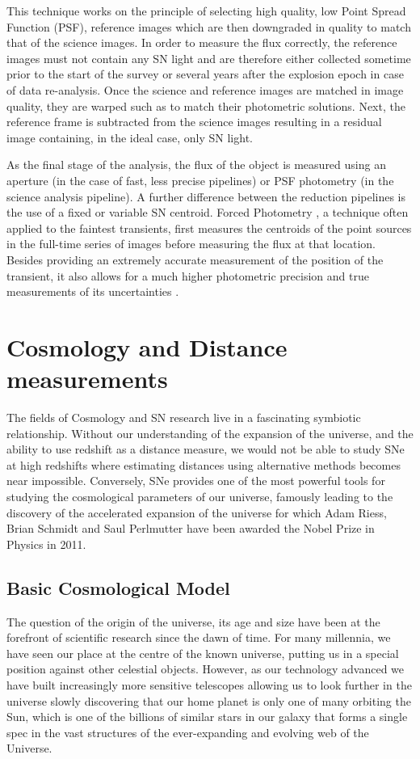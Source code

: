 This technique works on the principle of selecting high quality, low Point Spread Function (PSF), reference images which are then downgraded in quality to match that of the science images. In order to measure the flux correctly, the reference images must not contain any SN light and are therefore either collected sometime prior to the start of the survey or several years after the explosion epoch in case of data re-analysis. Once the science and reference images are matched in image quality, they are warped such as to match their photometric solutions. Next, the reference frame is subtracted from the science images resulting in a residual image containing, in the ideal case, only SN light.

As the final stage of the analysis, the flux of the object is measured using an aperture (in the case of fast, less precise pipelines) or PSF photometry (in the science analysis pipeline). A further difference between the reduction pipelines is the use of a fixed or variable SN centroid. Forced Photometry \citep{Bertin2011}, a technique often applied to the faintest transients, first measures the centroids of the point sources in the full-time series of images before measuring the flux at that location. Besides providing an extremely accurate measurement of the position of the transient, it also allows for a much higher photometric precision and true measurements of its uncertainties \citep{Firth2015}.

\section{Cosmology and Distance measurements}
The fields of Cosmology and SN research live in a fascinating symbiotic relationship. Without our understanding of the expansion of the universe, and the ability to use redshift as a distance measure, we would not be able to study SNe at high redshifts where estimating distances using alternative methods becomes near impossible. Conversely, SNe provides one of the most powerful tools for studying the cosmological parameters of our universe, famously leading to the discovery of the accelerated expansion of the universe \citep{Riess1998,Perlmutter1999} for which Adam Riess, Brian Schmidt and Saul Perlmutter have been awarded the Nobel Prize in Physics in 2011.

\subsection{Basic Cosmological Model}
The question of the origin of the universe, its age and size have been at the forefront of scientific research since the dawn of time. For many millennia, we have seen our place at the centre of the known universe, putting us in a special position against other celestial objects. However, as our technology advanced we have built increasingly more sensitive telescopes allowing us to look further in the universe slowly discovering that our home planet is only one of many orbiting the Sun, which is one of the billions of similar stars in our galaxy that forms a single spec in the vast structures of the ever-expanding and evolving web of the Universe.

